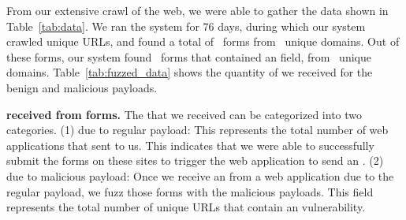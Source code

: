 From our extensive crawl of the web, we were able to gather the data
shown in Table~\ref{tab:data}. We ran the system for 76 days, during which our system crawled \urls unique URLs,
and found a total of \forms\ forms from \uniqueforms\ unique domains. Out of these forms, our system
found \emailforms\ forms that contained an \email field, from \uniqueemailforms\ unique domains.
Table~\ref{tab:fuzzed_data} shows the quantity of \emails we received for the benign and malicious payloads. 

%

\noindent\textbf{\Email received from forms.} The \emails that we
received can be categorized into two categories. (1) \Emails due to
regular payload: This represents the total number of web applications
that sent \emails to us. This indicates that we were able to
successfully submit the forms on these sites to trigger the web
application to send an \email. (2) \Emails due to malicious payload:
Once we receive an \email from a web application due to the regular
payload, we fuzz those forms with the malicious payloads. This field
represents the total number of unique URLs that contain an \ehi
vulnerability.


